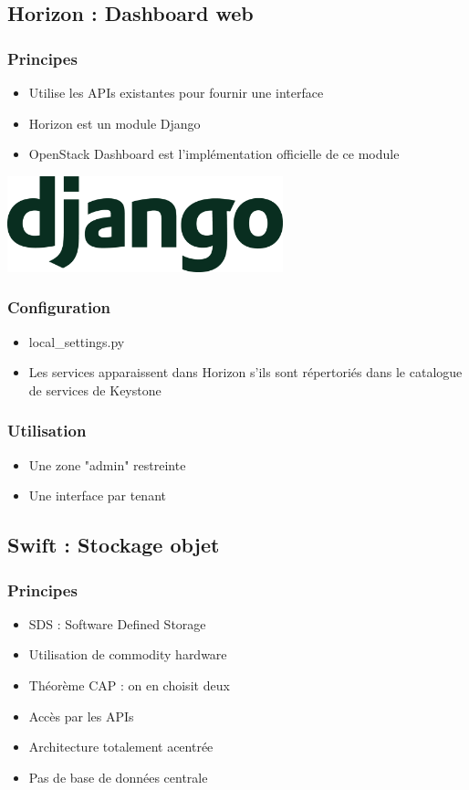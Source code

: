   \subsection[Horizon]{Horizon : Dashboard web}

  \begin{frame}
    \frametitle{Principes}
    \begin{itemize}
      \item Utilise les APIs existantes pour fournir une interface
      \item Horizon est un module Django
      \item OpenStack Dashboard est l'implémentation officielle de ce module
    \end{itemize}
    \begin{center}
      \includegraphics[width=8cm]{images/django-logo.png}
    \end{center}
  \end{frame}

  \begin{frame}
    \frametitle{Configuration}
    \begin{itemize}
      \item local\_settings.py
      \item Les services apparaissent dans Horizon s'ils sont répertoriés dans le catalogue de services de Keystone
    \end{itemize}
  \end{frame}

  \begin{frame}
    \frametitle{Utilisation}
    \begin{itemize}
      \item Une zone "admin" restreinte
      \item Une interface par tenant
    \end{itemize}
  \end{frame}

  \subsection[Swift]{Swift : Stockage objet}

  \begin{frame}
    \frametitle{Principes}
    \begin{itemize}
      \item SDS : Software Defined Storage
      \item Utilisation de commodity hardware
      \item Théorème CAP : on en choisit deux
      \item Accès par les APIs
      \item Architecture totalement acentrée
      \item Pas de base de données centrale
    \end{itemize}
  \end{frame}

